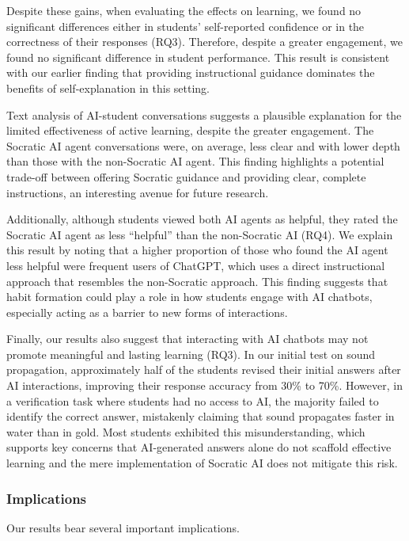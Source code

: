 \documentclass[
  12pt,
]{article}
\begin{document}
Despite these gains, when evaluating the effects on learning, we found no significant differences either in students' self-reported confidence or in the correctness of their responses (RQ3). Therefore, despite a greater engagement, we found no significant difference in student performance. This result is consistent with our earlier finding that providing instructional guidance dominates the benefits of self-explanation in this setting.

Text analysis of AI-student conversations suggests a plausible explanation for the limited effectiveness of active learning, despite the greater engagement. The Socratic AI agent conversations were, on average, less clear and with lower depth than those with the non-Socratic AI agent. This finding highlights a potential trade-off between offering Socratic guidance and providing clear, complete instructions, an interesting avenue for future research.

Additionally, although students viewed both AI agents as helpful, they rated the Socratic AI agent as less ``helpful'' than the non-Socratic AI (RQ4). We explain this result by noting that a higher proportion of those who found the AI agent less helpful were frequent users of ChatGPT, which uses a direct instructional approach that resembles the non-Socratic approach. This finding suggests that habit formation could play a role in how students engage with AI chatbots, especially acting as a barrier to new forms of interactions.

Finally, our results also suggest that interacting with AI chatbots may not promote meaningful and lasting learning (RQ3). In our initial test on sound propagation, approximately half of the students revised their initial answers after AI interactions, improving their response accuracy from 30\% to 70\%. However, in a verification task where students had no access to AI, the majority failed to identify the correct answer, mistakenly claiming that sound propagates faster in water than in gold. Most students exhibited this misunderstanding, which supports key concerns that AI-generated answers alone do not scaffold effective learning and the mere implementation of Socratic AI does not mitigate this risk.

\subsubsection{Implications}\label{implications}

Our results bear several important implications.
\end{document}

